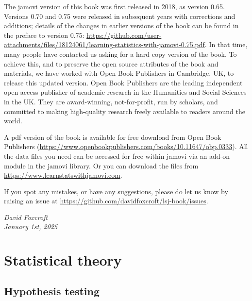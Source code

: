 \documentclass[
  a4paper,
]{book}
\begin{document}
The jamovi version of this book was first released in 2018, as version
0.65. Versions 0.70 and 0.75 were released in subsequent years with
corrections and additions; details of the changes in earlier versions of
the book can be found in the preface to version 0.75:
\url{https://github.com/user-attachments/files/18124061/learning-statistics-with-jamovi-0.75.pdf}.
In that time, many people have contacted us asking for a hard copy
version of the book. To achieve this, and to preserve the open source
attributes of the book and materials, we have worked with Open Book
Publishers in Cambridge, UK, to release this updated version. Open Book
Publishers are the leading independent open access publisher of academic
research in the Humanities and Social Sciences in the UK. They are
award-winning, not-for-profit, run by scholars, and committed to making
high-quality research freely available to readers around the world.

\begin{tcolorbox}[enhanced jigsaw, toprule=.15mm, bottomrule=.15mm, toptitle=1mm, opacitybacktitle=0.6, left=2mm, coltitle=black, bottomtitle=1mm, opacityback=0, title=\textcolor{quarto-callout-note-color}{\faInfo}\hspace{0.5em}{Note}, rightrule=.15mm, arc=.35mm, titlerule=0mm, colback=white, leftrule=.75mm, colbacktitle=quarto-callout-note-color!10!white, breakable, colframe=quarto-callout-note-color-frame]

A pdf version of the book is available for free download from Open Book
Publishers
(\url{https://www.openbookpublishers.com/books/10.11647/obp.0333}). All
the data files you need can be accessed for free within jamovi via an
add-on module in the jamovi library. Or you can download the files from
\url{https://www.learnstatswithjamovi.com}.

\end{tcolorbox}

If you spot any mistakes, or have any suggestions, please do let us know
by raising an issue at
\url{https://github.com/davidfoxcroft/lsj-book/issues}.

\emph{David Foxcroft\\
January 1st, 2025}

\part{Statistical theory}

\chapter{Hypothesis testing}\label{sec-Hypothesis-testing}
\end{document}
